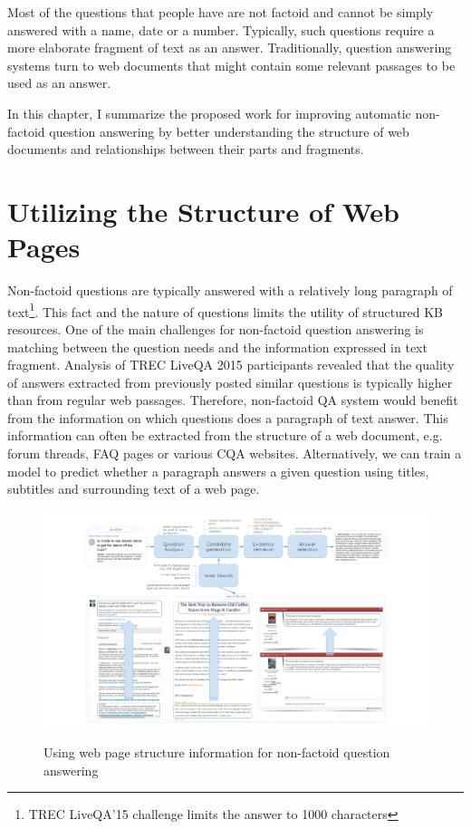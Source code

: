 %


Most of the questions that people have are not factoid and cannot be simply answered with a name, date or a number.
Typically, such questions require a more elaborate fragment of text as an answer.
Traditionally, question answering systems turn to web documents that might contain some relevant passages to be used as an answer.

\noindent
In this chapter, I summarize the proposed work for improving automatic non-factoid question answering by better understanding the structure of web documents and relationships between their parts and fragments.

\section{Utilizing the Structure of Web Pages}

Non-factoid questions are typically answered with a relatively long paragraph of text\footnote{TREC LiveQA'15 challenge limits the answer to 1000 characters}.
This fact and the nature of questions limits the utility of structured KB resources.
One of the main challenges for non-factoid question answering is matching between the question needs and the information expressed in text fragment.
Analysis of TREC LiveQA 2015 participants \cite{savenkov2015liveqa} revealed that the quality of answers extracted from previously posted similar questions is typically higher than from regular web passages.
Therefore, non-factoid QA system would benefit from the information on which questions does a paragraph of text answer.
This information can often be extracted from the structure of a web document, e.g. forum threads, FAQ pages or various CQA websites.
Alternatively, we can train a model to predict whether a paragraph answers a given question using titles, subtitles and surrounding text of a web page.

\begin{figure}[h]
\centering
\includegraphics[width=\textwidth]{img/web_page_structure_nonfactoid}
\label{fig:web_page_structure_nonfactoid}
\caption{Using web page structure information for non-factoid question answering}
\end{figure}

